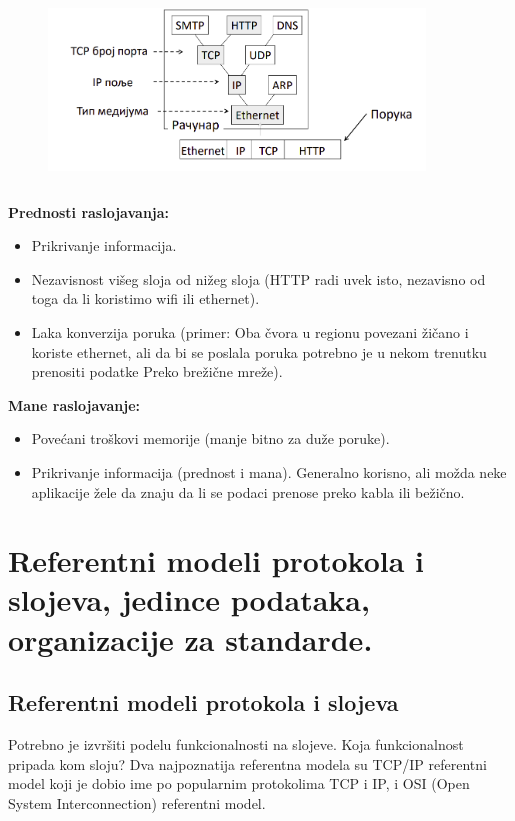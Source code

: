 \documentclass[a4paper]{article}
\begin{document}
    \begin{figure}[H]
        \begin{center}
            \includegraphics[width=100mm,height=50mm]{Slike/demultipleksiranje.png}
        \end{center}
    \end{figure}
    \noindent \textbf{Prednosti raslojavanja:}
    \begin{itemize}
        \item Prikrivanje informacija.
        \item Nezavisnost višeg sloja od nižeg sloja 
              (HTTP radi uvek isto, nezavisno od toga da li koristimo wifi ili ethernet).
        \item Laka konverzija poruka (primer: Oba čvora u regionu povezani žičano i koriste ethernet,
              ali da bi se poslala poruka potrebno je u nekom trenutku prenositi podatke Preko
              brežične mreže).
    \end{itemize}
    \textbf{Mane raslojavanje:}
    \begin{itemize}
        \item Povećani troškovi memorije (manje bitno za duže poruke).
        \item Prikrivanje informacija (prednost i mana). Generalno korisno, ali možda neke aplikacije
              žele da znaju da li se podaci prenose preko kabla ili bežično.
    \end{itemize}

\section{Referentni modeli protokola i slojeva, jedince podataka, organizacije za standarde.}
    \subsection{Referentni modeli protokola i slojeva}
        Potrebno je izvršiti podelu funkcionalnosti na slojeve. Koja funkcionalnost pripada kom sloju?
        Dva najpoznatija referentna modela su TCP/IP referentni model koji je dobio ime po 
        popularnim protokolima TCP i IP, i OSI (Open System Interconnection) referentni model.
        
\end{document}

